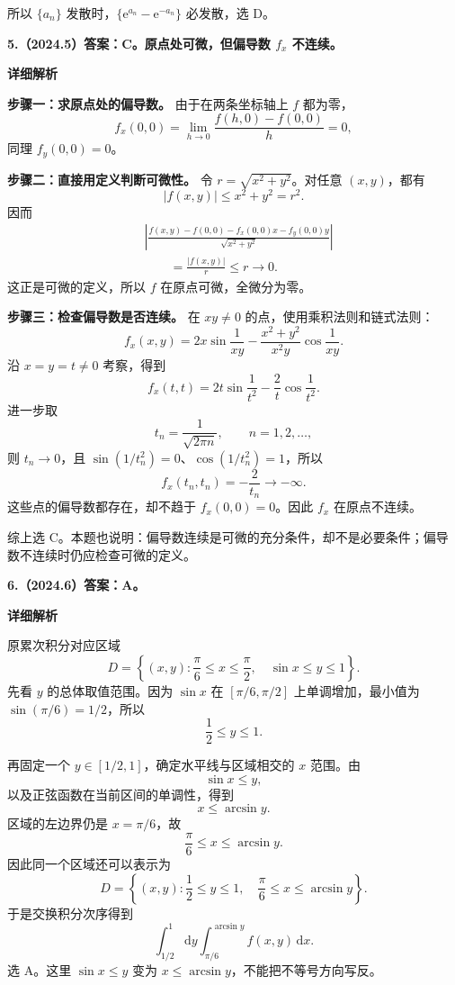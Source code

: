 \documentclass[UTF8,11pt,fontset=windows]{ctexart}
\begin{document}
所以 $\{a_n\}$ 发散时，$\{\mathrm e^{a_n}-\mathrm e^{-a_n}\}$ 必发散，选 D。

\clearpage

\textbf{5.（2024.5）答案：C。原点处可微，但偏导数 $f_x$ 不连续。}

\textbf{详细解析}

\textbf{步骤一：求原点处的偏导数。} 由于在两条坐标轴上 $f$ 都为零，
$$
f_x(0,0)=\lim_{h\to0}\frac{f(h,0)-f(0,0)}h=0,
$$
同理 $f_y(0,0)=0$。

\textbf{步骤二：直接用定义判断可微性。} 令 $r=\sqrt{x^2+y^2}$。对任意 $(x,y)$，都有
$$
|f(x,y)|\le x^2+y^2=r^2.
$$
因而
$$
\begin{aligned}
&\left|\frac{f(x,y)-f(0,0)-f_x(0,0)x-f_y(0,0)y}
{\sqrt{x^2+y^2}}\right|\\
&\qquad=\frac{|f(x,y)|}{r}\le r\longrightarrow0.
\end{aligned}
$$
这正是可微的定义，所以 $f$ 在原点可微，全微分为零。

\textbf{步骤三：检查偏导数是否连续。} 在 $xy\ne0$ 的点，使用乘积法则和链式法则：
$$
f_x(x,y)=2x\sin\frac1{xy}
-\frac{x^2+y^2}{x^2y}\cos\frac1{xy}.
$$
沿 $x=y=t\ne0$ 考察，得到
$$
f_x(t,t)=2t\sin\frac1{t^2}-\frac2t\cos\frac1{t^2}.
$$
进一步取
$$
t_n=\frac1{\sqrt{2\pi n}},\qquad n=1,2,\ldots,
$$
则 $t_n\to0$，且 $\sin(1/t_n^2)=0$、$\cos(1/t_n^2)=1$，所以
$$
f_x(t_n,t_n)=-\frac2{t_n}\longrightarrow-\infty.
$$
这些点的偏导数都存在，却不趋于 $f_x(0,0)=0$。因此 $f_x$ 在原点不连续。

综上选 C。本题也说明：偏导数连续是可微的充分条件，却不是必要条件；偏导数不连续时仍应检查可微的定义。

\clearpage

\textbf{6.（2024.6）答案：A。}

\textbf{详细解析}

原累次积分对应区域
$$
D=\left\{(x,y):\frac\pi6\le x\le\frac\pi2,
\quad\sin x\le y\le1\right\}.
$$
先看 $y$ 的总体取值范围。因为 $\sin x$ 在 $[\pi/6,\pi/2]$ 上单调增加，最小值为 $\sin(\pi/6)=1/2$，所以
$$
\frac12\le y\le1.
$$

再固定一个 $y\in[1/2,1]$，确定水平线与区域相交的 $x$ 范围。由
$$
\sin x\le y,
$$
以及正弦函数在当前区间的单调性，得到
$$
x\le\arcsin y.
$$
区域的左边界仍是 $x=\pi/6$，故
$$
\frac\pi6\le x\le\arcsin y.
$$
因此同一个区域还可以表示为
$$
D=\left\{(x,y):\frac12\le y\le1,
\quad\frac\pi6\le x\le\arcsin y\right\}.
$$
于是交换积分次序得到
$$
\boxed{
\int_{1/2}^{1}\mathrm dy\int_{\pi/6}^{\arcsin y}f(x,y)\,\mathrm dx
}.
$$
选 A。这里 $\sin x\le y$ 变为 $x\le\arcsin y$，不能把不等号方向写反。
\end{document}
